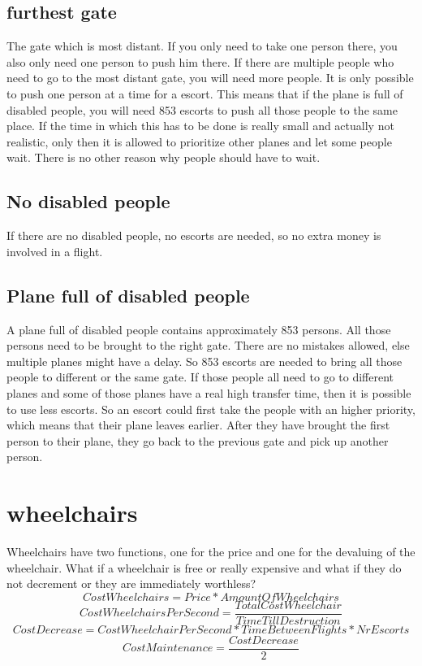 \documentclass[a4paper, 11pt, notitlepage]{report}
\begin{document}
\subsection{furthest gate}
The gate which is most distant. If you only need to take one person there, you also only need one person to push him there. If there are multiple people who need to go to the most distant gate, you will need more people. It is only possible to push one person at a time for a escort. This means that if the plane is full of disabled people, you will need 853 escorts to push all those people to the same place. If the time in which this has to be done is really small and actually not realistic, only then it is allowed to prioritize other planes and let some people wait. There is no other reason why people should have to wait.
\subsection{No disabled people}
If there are no disabled people, no escorts are needed, so no extra money is involved in a flight.
\subsection{Plane full of disabled people}
A plane full of disabled people contains approximately 853 persons. All those persons need to be brought to the right gate. There are no mistakes allowed, else multiple planes might have a delay. So 853 escorts are needed to bring all those people to different or the same gate. If those people all need to go to different planes and some of those planes have a real high transfer time, then it is possible to use less escorts. So an escort could first take the people with an higher priority, which means that their plane leaves earlier. After they have brought the first person to their plane, they go back to the previous gate and pick up another person.
\section{wheelchairs}
Wheelchairs have two functions, one for the price and one for the devaluing of the wheelchair. What if a wheelchair is free or really expensive and what if they do not decrement or they are immediately worthless?\\
\begin{equation}
CostWheelchairs = Price * AmountOfWheelchairs
\end{equation}
\begin{equation}
CostWheelchairsPerSecond = \frac{TotalCostWheelchair}{TimeTillDestruction}
\end{equation}
\begin{equation}
CostDecrease = CostWheelchairPerSecond * TimeBetweenFlights * NrEscorts
\end{equation}
\begin{equation}
CostMaintenance = \frac{CostDecrease}{2}
\end{equation}
\end{document}
